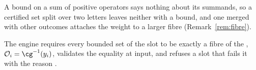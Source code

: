 
A bound on a sum of positive operators says nothing about its summands, so a
certified set split over two letters leaves neither with a bound, and one
merged with other outcomes attaches the weight to a larger fibre
(Remark~\ref{rem:fibre}).

\begin{requirement}\label{req:fibre-equality}
The engine requires every bounded set of the slot to be exactly a fibre of
the , $\mathcal{O}_i=\cg^{-1}(y_i)$, validates
the equality at input, and refuses a slot that fails it with the reason
.
\end{requirement}
